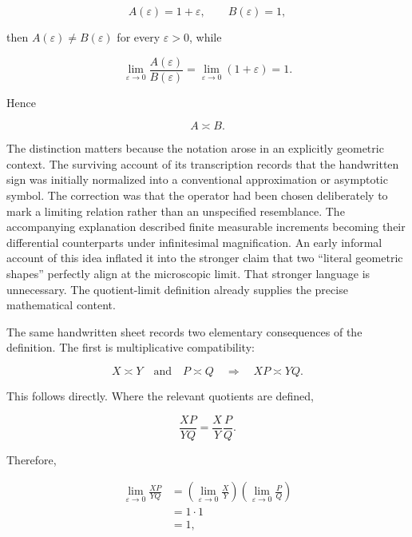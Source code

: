 \documentclass[11pt]{article}
\newcommand{\ulteq}{\mathrel{\text{≍}}}
\begin{document}
\begin{equation}
A(\varepsilon)=1+\varepsilon,
\qquad
B(\varepsilon)=1,
\end{equation}

then $A(\varepsilon)\neq B(\varepsilon)$ for every $\varepsilon>0$, while

\begin{equation}
\lim_{\varepsilon\to0}\frac{A(\varepsilon)}{B(\varepsilon)}
=
\lim_{\varepsilon\to0}(1+\varepsilon)
=
1.
\end{equation}

Hence

\begin{equation}
A\ulteq B.
\end{equation}

The distinction matters because the notation arose in an explicitly geometric context. The surviving account of its transcription records that the handwritten sign was initially normalized into a conventional approximation or asymptotic symbol. The correction was that the operator had been chosen deliberately to mark a limiting relation rather than an unspecified resemblance. The accompanying explanation described finite measurable increments becoming their differential counterparts under infinitesimal magnification. An early informal account of this idea inflated it into the stronger claim that two ``literal geometric shapes'' perfectly align at the microscopic limit. That stronger language is unnecessary. The quotient-limit definition already supplies the precise mathematical content.

The same handwritten sheet records two elementary consequences of the definition. The first is multiplicative compatibility:

\begin{equation}
X\ulteq Y
\quad\text{and}\quad
P\ulteq Q
\quad\Longrightarrow\quad
XP\ulteq YQ.
\end{equation}

This follows directly. Where the relevant quotients are defined,

\begin{equation}
\frac{XP}{YQ}
=
\frac{X}{Y}\frac{P}{Q}.
\end{equation}

Therefore,

\begin{align}
\lim_{\varepsilon\to0}\frac{XP}{YQ}
&=
\left(
\lim_{\varepsilon\to0}\frac{X}{Y}
\right)
\left(
\lim_{\varepsilon\to0}\frac{P}{Q}
\right)\\
&=1\cdot1\\
&=1,
\end{align}
\end{document}
